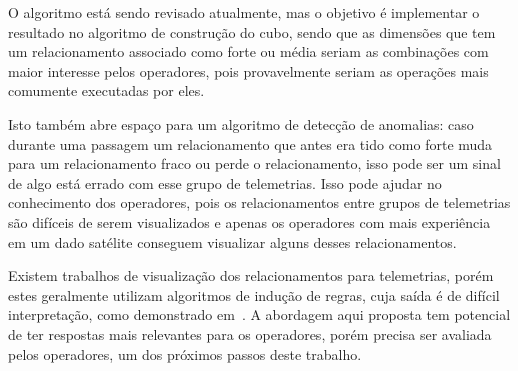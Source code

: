 O algoritmo está sendo revisado atualmente, mas o objetivo é implementar o resultado no algoritmo de construção do cubo, sendo que as dimensões que tem um relacionamento associado como forte ou média seriam as combinações com maior interesse pelos operadores, pois provavelmente seriam as operações mais comumente executadas por eles.

Isto também abre espaço para um algoritmo de detecção de anomalias: caso durante uma passagem um relacionamento que antes era tido como forte muda para um relacionamento fraco ou perde o relacionamento, isso pode ser um sinal de algo está errado com esse grupo de telemetrias.
Isso pode ajudar no conhecimento dos operadores, pois os relacionamentos entre grupos de telemetrias são difíceis de serem visualizados e apenas os operadores com mais experiência em um dado satélite conseguem visualizar alguns desses relacionamentos.

Existem trabalhos de visualização dos relacionamentos para telemetrias, porém estes geralmente utilizam algoritmos de indução de regras, cuja saída é de difícil interpretação, como demonstrado em~\cite{kannanMiningSatelliteTelemetry2016}.
A abordagem aqui proposta tem potencial de ter respostas mais relevantes para os operadores, porém precisa ser avaliada pelos operadores, um dos próximos passos deste trabalho.

